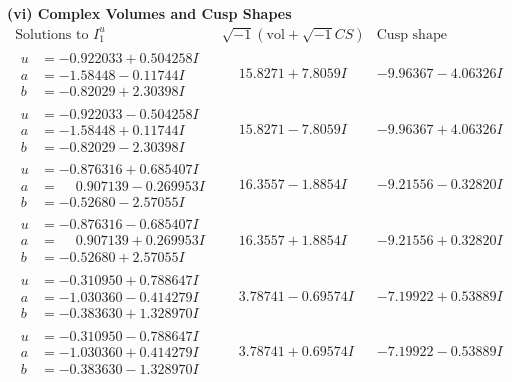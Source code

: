 \documentclass[1p]{elsarticle_modified}
\theoremstyle{definition}
\newcommand{\I}{\sqrt{-1}}
\begin{document}
\newpage\flushleft \textbf{(vi) Complex Volumes and Cusp Shapes}
$$\begin{array}{c|c|c}  
\text{Solutions to }I^u_{1}& \I (\text{vol} + \sqrt{-1}CS) & \text{Cusp shape}\\
 \hline 
\begin{aligned}
u &= -0.922033 + 0.504258 I \\
a &= -1.58448 - 0.11744 I \\
b &= -0.82029 + 2.30398 I\end{aligned}
 & \phantom{-}15.8271 + 7.8059 I & -9.96367 - 4.06326 I \\ \hline\begin{aligned}
u &= -0.922033 - 0.504258 I \\
a &= -1.58448 + 0.11744 I \\
b &= -0.82029 - 2.30398 I\end{aligned}
 & \phantom{-}15.8271 - 7.8059 I & -9.96367 + 4.06326 I \\ \hline\begin{aligned}
u &= -0.876316 + 0.685407 I \\
a &= \phantom{-}0.907139 - 0.269953 I \\
b &= -0.52680 - 2.57055 I\end{aligned}
 & \phantom{-}16.3557 - 1.8854 I & -9.21556 - 0.32820 I \\ \hline\begin{aligned}
u &= -0.876316 - 0.685407 I \\
a &= \phantom{-}0.907139 + 0.269953 I \\
b &= -0.52680 + 2.57055 I\end{aligned}
 & \phantom{-}16.3557 + 1.8854 I & -9.21556 + 0.32820 I \\ \hline\begin{aligned}
u &= -0.310950 + 0.788647 I \\
a &= -1.030360 - 0.414279 I \\
b &= -0.383630 + 1.328970 I\end{aligned}
 & \phantom{-}3.78741 - 0.69574 I & -7.19922 + 0.53889 I \\ \hline\begin{aligned}
u &= -0.310950 - 0.788647 I \\
a &= -1.030360 + 0.414279 I \\
b &= -0.383630 - 1.328970 I\end{aligned}
 & \phantom{-}3.78741 + 0.69574 I & -7.19922 - 0.53889 I \\ \hline\begin{aligned}

\end{aligned}
\end{array}$$
\end{document}
